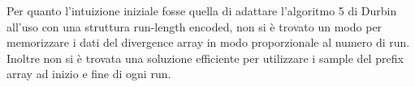 \documentclass[a4paper,11pt, oneside,italian]{article}
\begin{document}
Per quanto l'intuizione iniziale fosse quella di adattare l'algoritmo 5 di
Durbin all'uso con una struttura run-length encoded, non si è trovato un modo
per memorizzare i dati del divergence array in modo proporzionale al numero di
run. Inoltre non si è trovata una soluzione efficiente per utilizzare i sample
del prefix array ad inizio e fine di ogni run.
\end{document}
